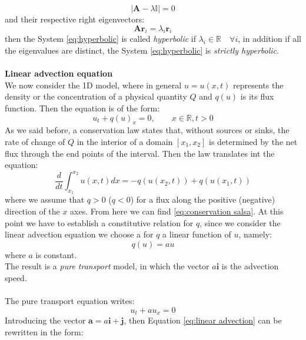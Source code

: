\documentclass[12pt,a4paper]{article}
\numberwithin{equation}{section}
\begin{document}
\begin{equation}
|\boldsymbol{A} - \lambda \mathbb{I}| =0
\end{equation}
and their respective right eigenvectors:
\begin{equation}
\boldsymbol{A}\boldsymbol{r}_i = \lambda_i\boldsymbol{r}_i
\end{equation}
then the System \ref{eq:hyperbolic} is called \textit{hyperbolic} if $\lambda_i \in \mathbb{R} \quad \forall i$, in addition if all the eigenvalues are distinct, the System \ref{eq:hyperbolic} is \textit{strictly hyperbolic}.\\
\\
{\bf Linear advection equation}\\
We now consider the 1D model, where in general $u = u(x,t)$ represents the density or the concentration of a physical quantity $Q$ and $q(u)$ is its flux function. Then the equation is of the form:
\begin{equation} \label{eq:conservation salsa}
u_t + q(u)_x = 0, \qquad x \in \mathbb{R}, t > 0
\end{equation}
As we said before, a conservation law states that, without sources or sinks, the rate of change of $Q$ in the interior of a domain $[x_1,x_2]$ is determined by the net flux through the end points of the interval. Then the law translates int the equation:
\begin{equation}
\frac{d}{dt} \int_{x_1}^{x_2} u(x,t)dx = -q(u(x_2,t))+q(u(x_1,t))
\end{equation}
where we assume that $q > 0$ ($q < 0$) for a flux along the positive (negative) direction of the $x$ axes. From here we can find \ref{eq:conservation salsa}. At this point we have to establish a constitutive relation for $q$, since we consider the linear advection equation we choose a for $q$ a linear function of $u$, namely:
\begin{equation*}
q(u) = au
\end{equation*}
where $a$ is constant. \\
The result is a \textit{pure transport} model, in which the vector $a\boldsymbol{i}$ is the advection speed.\\
\\
The pure transport equation writes:
\begin{equation} \label{eq:linear advection}
u_t +a u_x = 0
\end{equation}
Introducing the vector $\boldsymbol{a} = a \boldsymbol{i} + \boldsymbol{j}$, then Equation \ref{eq:linear advection} can be rewritten in the form:
\end{document}
